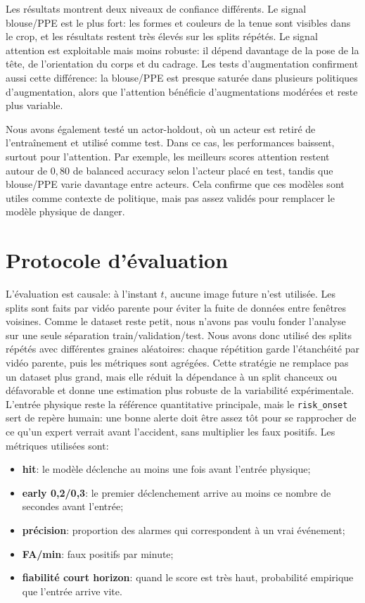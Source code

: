 \documentclass[11pt]{article}
\begin{document}
Les résultats montrent deux niveaux de confiance différents. Le signal blouse/PPE est le plus fort: les formes et couleurs de la tenue sont visibles dans le crop, et les résultats restent très élevés sur les splits répétés. Le signal attention est exploitable mais moins robuste: il dépend davantage de la pose de la tête, de l'orientation du corps et du cadrage. Les tests d'augmentation confirment aussi cette différence: la blouse/PPE est presque saturée dans plusieurs politiques d'augmentation, alors que l'attention bénéficie d'augmentations modérées et reste plus variable.

Nous avons également testé un actor-holdout, où un acteur est retiré de l'entraînement et utilisé comme test. Dans ce cas, les performances baissent, surtout pour l'attention. Par exemple, les meilleurs scores attention restent autour de $0,80$ de balanced accuracy selon l'acteur placé en test, tandis que blouse/PPE varie davantage entre acteurs. Cela confirme que ces modèles sont utiles comme contexte de politique, mais pas assez validés pour remplacer le modèle physique de danger.

\section{Protocole d'évaluation}
L'évaluation est causale: à l'instant $t$, aucune image future n'est utilisée. Les splits sont faits par vidéo parente pour éviter la fuite de données entre fenêtres voisines. Comme le dataset reste petit, nous n'avons pas voulu fonder l'analyse sur une seule séparation train/validation/test. Nous avons donc utilisé des splits répétés avec différentes graines aléatoires: chaque répétition garde l'étanchéité par vidéo parente, puis les métriques sont agrégées. Cette stratégie ne remplace pas un dataset plus grand, mais elle réduit la dépendance à un split chanceux ou défavorable et donne une estimation plus robuste de la variabilité expérimentale. L'entrée physique reste la référence quantitative principale, mais le \texttt{risk\_onset} sert de repère humain: une bonne alerte doit être assez tôt pour se rapprocher de ce qu'un expert verrait avant l'accident, sans multiplier les faux positifs. Les métriques utilisées sont:
\begin{itemize}[leftmargin=*]
\item \textbf{hit}: le modèle déclenche au moins une fois avant l'entrée physique;
\item \textbf{early 0,2/0,3}: le premier déclenchement arrive au moins ce nombre de secondes avant l'entrée;
\item \textbf{précision}: proportion des alarmes qui correspondent à un vrai événement;
\item \textbf{FA/min}: faux positifs par minute;
\item \textbf{fiabilité court horizon}: quand le score est très haut, probabilité empirique que l'entrée arrive vite.
\end{itemize}
\end{document}
